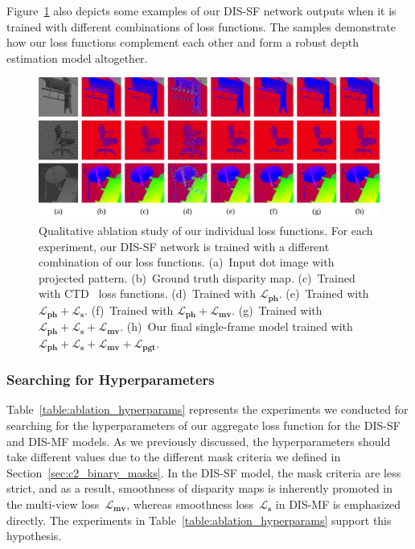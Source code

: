 Figure~\ref{fig:c2_ablation_loss} also depicts some examples of our DIS-SF network outputs when it is trained with different combinations of loss functions. The samples demonstrate how our loss functions complement each other and form a robust depth estimation model altogether.

\begin{figure}[t]
    \begin{center}
        \includegraphics[width=1\linewidth]{images/chapter2/supp_figures/ablation_loss.jpg}
    \end{center}
   \caption{Qualitative ablation study of our individual loss functions. For each experiment, our DIS-SF network is trained with a different combination of our loss functions. (a)~Input dot image with projected pattern. (b)~Ground truth disparity map. (c)~Trained with CTD~\cite{riegler2019connecting} loss functions. (d)~Trained with $\boldsymbol{\mathcal{L}_{ph}}$. (e)~Trained with $\boldsymbol{\mathcal{L}_{ph}} + \boldsymbol{\mathcal{L}_s}$. (f)~Trained with $\boldsymbol{\mathcal{L}_{ph}} + \boldsymbol{\mathcal{L}_{mv}}$. (g)~Trained with $\boldsymbol{\mathcal{L}_{ph}} + \boldsymbol{\mathcal{L}_s} + \boldsymbol{\mathcal{L}_{mv}}$. (h)~Our final single-frame model trained with $\boldsymbol{\mathcal{L}_{ph}} + \boldsymbol{\mathcal{L}_s} + \boldsymbol{\mathcal{L}_{mv}} + \boldsymbol{\mathcal{L}_{pgt}}$.}
    \label{fig:c2_ablation_loss}
\end{figure}

\subsubsection{Searching for Hyperparameters} \label{sec:c2_ablation_hyperparams}
Table~\ref{table:ablation_hyperparams} represents the experiments we conducted for searching for the hyperparameters of our aggregate loss function for the DIS-SF and DIS-MF models. As we previously discussed, the hyperparameters should take different values due to the different mask criteria we defined in Section~\ref{sec:c2_binary_masks}. In the DIS-SF model, the mask criteria are less strict, and as a result, smoothness of disparity maps is inherently promoted in the multi-view loss~$\boldsymbol{\mathcal{L}_{mv}}$, whereas smoothness loss~$\boldsymbol{\mathcal{L}_{s}}$ in DIS-MF is emphasized directly. The experiments in Table~\ref{table:ablation_hyperparams} support this hypothesis.

